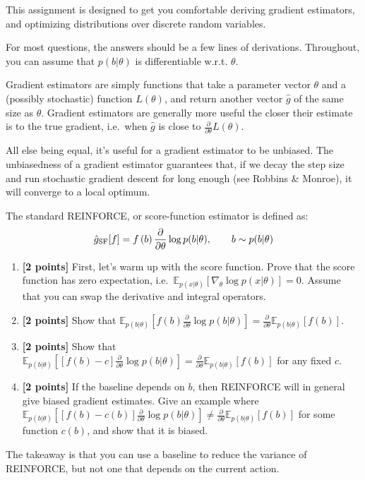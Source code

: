 \documentclass{harvardml}
\newcommand{\E}{\mathbb{E}}
\newcommand{\PT}{\frac{\partial}{\partial \theta}}
\theoremstyle{plain}
\begin{document}

This assignment is designed to get you comfortable deriving gradient estimators, and optimizing distributions over discrete random variables.

For most questions, the answers should be a few lines of derivations.
Throughout, you can assume that $p(b|\theta)$ is differentiable w.r.t. $\theta$.


\begin{problem}

Gradient estimators are simply functions that take a parameter vector $\theta$ and a (possibly stochastic) function $L(\theta)$, and return another vector $\hat g$ of the same size as $\theta$.
Gradient estimators are generally more useful the closer their estimate is to the true gradient, i.e.\ when $\hat g$ is close to $\PT L(\theta)$.

All else being equal, it's useful for a gradient estimator to be unbiased.
The unbiasedness of a gradient estimator guarantees that, if we decay the step size and run stochastic gradient descent for long enough (see Robbins \& Monroe), it will converge to a local optimum.

The standard REINFORCE, or score-function estimator is defined as:
%
\begin{align}
\hat g_\textnormal{SF}[f] = f \left( b \right) \PT \log p(b | \theta), \qquad b \sim p(b | \theta)
\end{align}

\begin{enumerate}[label=(\alph*)]
\item {\bf [2 points]} First, let's warm up with the score function.  Prove that the score function has zero expectation, i.e.\ $\E_{p(x|\theta)} \left[ \nabla_\theta \log p(x|\theta) \right] = 0$.
Assume that you can swap the derivative and integral operators.

\item {\bf [2 points]} Show that $\E_{p(b|\theta)} \left[ f(b) \PT \log p(b | \theta) \right] = \PT \E_{p(b|\theta)} \left[ f(b) \right]$.

\item {\bf [2 points]} Show that $\E_{p(b|\theta)} \left[ [f(b) - c] \PT \log p(b | \theta) \right] = \PT \E_{p(b|\theta)} \left[ f(b) \right]$ for any fixed $c$.

\item {\bf [2 points]} If the baseline depends on $b$, then REINFORCE will in general give biased gradient estimates.
Give an example where $\E_{p(b|\theta)} \left[ [f(b) - c(b)] \PT \log p(b | \theta) \right] \neq \PT \E_{p(b|\theta)}\left[ f(b) \right]$ for some function $c(b)$, and show that it is biased.
\end{enumerate}

The takeaway is that you can use a baseline to reduce the variance of REINFORCE, but not one that depends on the current action.
\end{problem}
\end{document}
